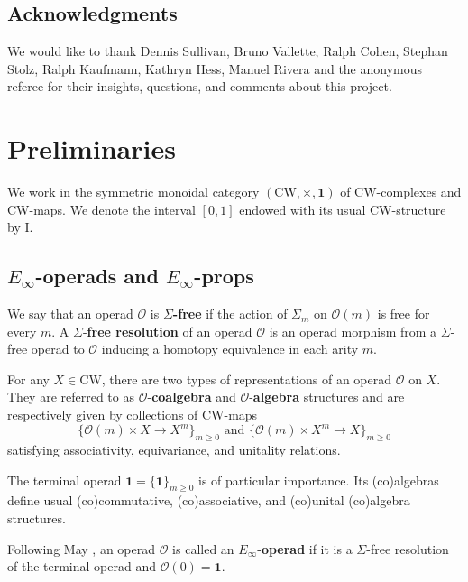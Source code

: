 \documentclass{amsart}
\newcommand{\I}{\mathrm{I}}
\newcommand{\CW}{{\mathrm{CW}}}
\renewcommand{\1}{\mathbf{1}}
\theoremstyle{definition}
\begin{document}
\subsection*{Acknowledgments} 

We would like to thank Dennis Sullivan, Bruno Vallette, Ralph Cohen, Stephan Stolz, Ralph Kaufmann, Kathryn Hess, Manuel Rivera and the anonymous referee for their insights, questions, and comments about this project. 

\section{Preliminaries}

We work in the symmetric monoidal category $(\CW,\times,\1)$ of CW-complexes and CW-maps. We denote the interval $[0,1]$ endowed with its usual CW-structure by $\I$.

\subsection{$E_\infty$-operads and $E_\infty$-props}

We say that an operad $\mathcal{O}$ is $\Sigma$\textbf{-free} if the action of $\Sigma_m$ on $\mathcal{O}(m)$ is free for every $m$. A $\Sigma$-\textbf{free resolution} of an operad $\mathcal{O}$ is an operad morphism from a $\Sigma$-free operad to $\mathcal{O}$ inducing a homotopy equivalence in each arity $m$. 

For any $X \in \CW$, there are two types of representations of an operad $\mathcal{O}$ on $X$. They are referred to as $\mathcal{O}$-\textbf{coalgebra} and $\mathcal{O}$-\textbf{algebra} structures and are respectively given by collections of CW-maps
\begin{equation*}
\{\mathcal{O}(m) \times X \to X^m\}_{m \geq 0} \text{ \ and \ } \{\mathcal{O}(m) \times X^m \to X\}_{m \geq 0}
\end{equation*}	
satisfying associativity, equivariance, and unitality relations.

The terminal operad $\1 = \{\1\}_{m\geq0}$ is of particular importance. Its (co)algebras define usual (co)commutative, (co)associative, and (co)unital (co)algebra structures. 

Following May \cite{may2006geometry}, an operad $\mathcal{O}$ is called an $E_\infty$-\textbf{operad} if it is a $\Sigma$-free resolution of the terminal operad and $\mathcal{O}(0)=\1$.
\end{document}
